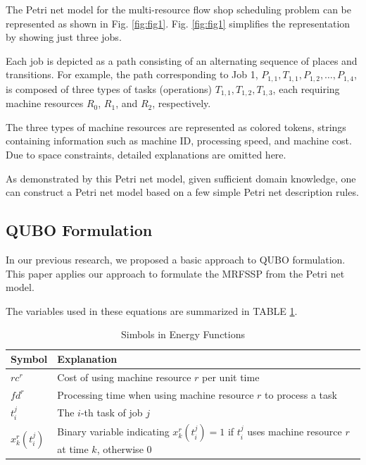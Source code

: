 \documentclass[conference]{IEEEtran}
\begin{document}
The Petri net model for the multi-resource flow shop scheduling problem can be represented as shown in Fig. \ref{fig:fig1}. Fig. \ref{fig:fig1} simplifies the representation by showing just three jobs.

Each job is depicted as a path consisting of an alternating sequence of places and transitions. For example, the path corresponding to Job 1, $P_{1,1}, T_{1,1}, P_{1,2}, \ldots, P_{1,4}$, is composed of three types of tasks (operations) $T_{1,1}, T_{1,2}, T_{1,3}$, each requiring machine resources $R_0$, $R_1$, and $R_2$, respectively.

The three types of machine resources are represented as colored tokens, strings containing information such as machine ID, processing speed, and machine cost. Due to space constraints, detailed explanations are omitted here.

As demonstrated by this Petri net model, given sufficient domain knowledge, one can construct a Petri net model based on a few simple Petri net description rules.

\subsection{QUBO Formulation}

In our previous research, we proposed a basic approach to QUBO formulation. This paper applies our approach to formulate the MRFSSP from the Petri net model.

The variables used in these equations are summarized in TABLE \ref{variable}.
\begin{table}[h] 
\centering 
\caption{Simbols in Energy Functions} 
\begin{tabularx}{0.45\textwidth}{>{\centering\arraybackslash}p{1.7cm}X} 
\hline 
Symbol  & Explanation \\ \hline 
$rc^r$ & Cost of using machine resource $r$ per unit time  \\
$fd^r$ & Processing time when using machine resource $r$ to process a task \\
$t_{i}^{j}$ & The $i$-th task of job $j$  \\
$x_{k}^{r}(t_{i}^{j})$ & Binary variable indicating $x_{k}^{r}(t_{i}^{j})=1$ if $t_{i}^{j}$ uses machine resource $r$ at time $k$, otherwise 0 \\ \hline

\end{tabularx} 
\label{variable} 
\end{table}
\end{document}
